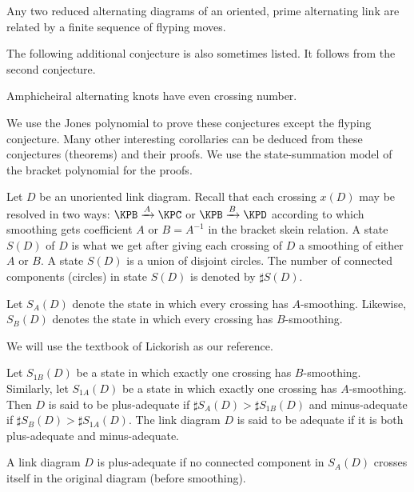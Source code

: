 \begin{conjecture}
\label{cha:resolv-tait-conj}
Any two reduced alternating diagrams of an oriented, prime alternating link are related by a finite sequence of flyping moves.
\end{conjecture}

The following additional conjecture is also sometimes listed. It follows from the second conjecture.

\begin{conjecture}
\label{cha:resolv-tait-conj}
Amphicheiral alternating knots have even crossing number.
\end{conjecture}

We use the Jones polynomial to prove these conjectures except the flyping conjecture. Many other interesting corollaries can be deduced from these conjectures (theorems) and their proofs. We use the state-summation model of the bracket polynomial for the proofs.

Let $D$ be an unoriented link diagram. Recall that each crossing $x(D)$ may be resolved in two ways: $\KPB \xrightarrow{A} \KPC$ or $\KPB \xrightarrow{B} \KPD$ according to which smoothing gets coefficient $A$ or $B = A^{-1}$ in the bracket skein relation. A state $S(D)$ of $D$ is what we get after giving each crossing of $D$ a smoothing of either $A$ or $B$. A state $S(D)$ is a union of disjoint circles. The number of connected components (circles) in state $S(D)$ is denoted by $\sharp S(D)$.

Let $S_A(D)$ denote the state in which every crossing has $A$-smoothing. Likewise, $S_B(D)$ denotes the state in which every crossing has $B$-smoothing.

We will use the textbook of Lickorish \cite{lickorish1997} as our reference.

\begin{definition}
\label{sec:first-tait-conj-2}
Let $S_{1B}(D)$ be a state in which exactly one crossing has $B$-smoothing. Similarly, let $S_{1A}(D)$ be a state in which exactly one crossing has $A$-smoothing. Then $D$ is said to be plus-adequate if $\sharp S_A(D) > \sharp S_{1B}(D)$ and minus-adequate if $\sharp S_B(D) > \sharp S_{1A}(D)$. The link diagram $D$ is said to be adequate if it is both plus-adequate and minus-adequate.
\end{definition}

\begin{proposition}
\label{sec:first-tait-conj-3}
A link diagram $D$ is plus-adequate if no connected component in $S_A(D)$ crosses itself in the original diagram (before smoothing).
\end{proposition}

